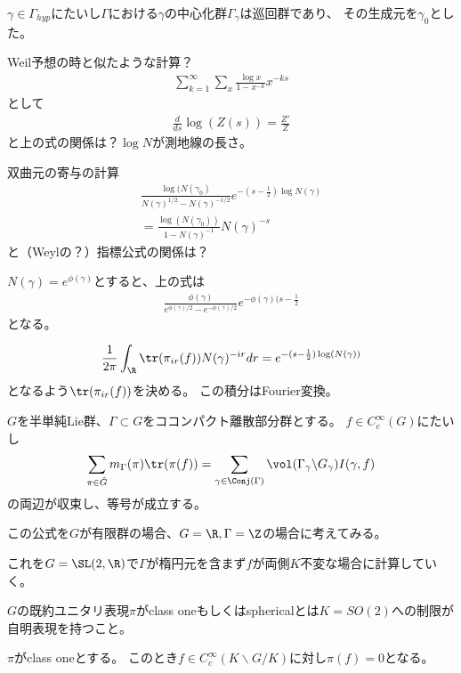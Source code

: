 \documentclass{jsarticle}
\begin{document}
$\gamma\in\Gamma_{hyp}$にたいし$\Gamma$における$\gamma$の中心化群$\Gamma_\gamma$は巡回群であり、
その生成元を$\gamma_0$とした。

Weil予想の時と似たような計算？
\begin{align*}
\sum^\infty_{k=1}\sum_x\frac{\log x}{1-x^{-k}}x^{-ks}
\end{align*}
として
\begin{align*}
\frac{d}{ds}\log(Z(s))=\frac{Z'}{Z}
\end{align*}
と上の式の関係は？$\log N$が測地線の長さ。

双曲元の寄与の計算
\begin{align*}
\frac{\log(N(\gamma_0)}{N(\gamma)^{1/2}-N(\gamma)^{-1/2}}e^{-(s-\frac{1}{2})\log N(\gamma)}\\
=\frac{\log(N(\gamma_0))}{1-N(\gamma)^{-1}}N(\gamma)^{-s}
\end{align*}
と（Weylの？）指標公式の関係は？

$N(\gamma)=e^{\phi(\gamma)}$とすると、上の式は
\begin{align*}
\frac{\phi(\gamma)}{e^{\phi(\gamma)/2}-e^{-\phi(\gamma)/2}}e^{-\phi(\gamma)(s-\frac{1}{2}}
\end{align*}
となる。

\begin{align*}
\frac{1}{2\pi}\int_\R\tr(\pi_{ir}(f))N(\gamma)^{-ir}dr=e^{-(s-\frac{1}{2})\log(N(\gamma))}
\end{align*}
となるよう$\tr(\pi_{ir}(f))$を決める。
この積分はFourier変換。
\begin{thm}
$G$を半単純Lie群、$\Gamma\subset G$をココンパクト離散部分群とする。
$f\in C_c^\infty(G)$にたいし
\begin{align*}
\sum_{\pi\in\hat{G}}m_\Gamma(\pi)\tr(\pi(f))=\sum_{\gamma\in\Conj(\Gamma)}\vol(\Gamma_\gamma\backslash G_\gamma)I(\gamma,f)
\end{align*}
の両辺が収束し、等号が成立する。
\end{thm}

この公式を$G$が有限群の場合、$G=\R, \Gamma=\Z$の場合に考えてみる。


これを$G=\SL(2,\R)$で$\Gamma$が楕円元を含まず$f$が両側$K$不変な場合に計算していく。

$G$の既約ユニタリ表現$\pi$がclass oneもしくはsphericalとは$K=SO(2)$への制限が自明表現を持つこと。
\begin{prop}
$\pi$がclass oneとする。
このとき$f\in C^\infty_c(K\backslash G/K)$に対し$\pi(f)=0$となる。
\end{prop}
\end{document}
